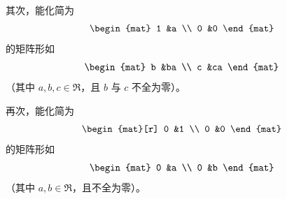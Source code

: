 \begin{exercises}
\begin{answer}
       其次，能化简为 
       \begin{equation*}
         \begin{mat}
           1  &a  \\
           0  &0
         \end{mat}
       \end{equation*}
       的矩阵形如
       \begin{equation*}
         \begin{mat}
           b  &ba \\
           c  &ca
         \end{mat}
       \end{equation*}
       （其中 \( a,b,c\in\Re \)，且 \(b\) 与 \(c\) 不全为零）。  

       再次，能化简为 
       \begin{equation*}
         \begin{mat}[r]
           0  &1  \\
           0  &0
         \end{mat}
       \end{equation*}
       的矩阵形如
       \begin{equation*}
         \begin{mat}
           0  &a \\
           0  &b
         \end{mat}
       \end{equation*}
       （其中 \( a,b\in\Re \)，且不全为零）。  


\end{answer}
\end{exercises}
